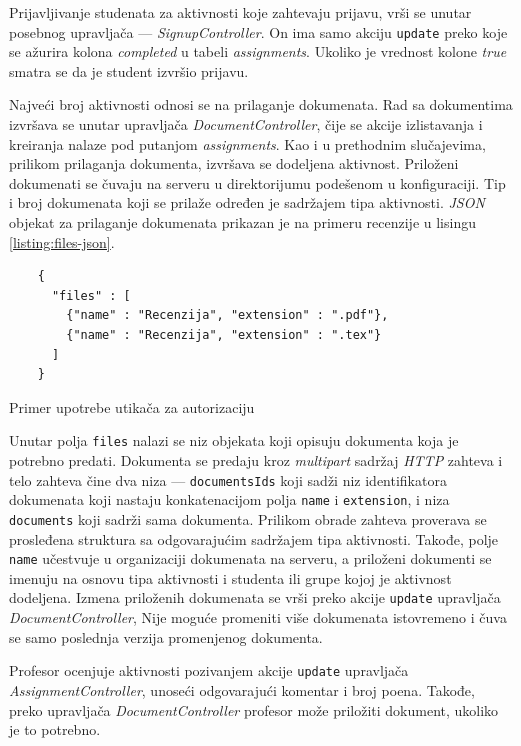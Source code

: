 \documentclass[12pt,oneside]{memoir}
\begin{document}
Prijavljivanje studenata za aktivnosti koje zahtevaju prijavu, vrši se unutar posebnog upravljača --- \emph{SignupController}.
On ima samo akciju \texttt{update} preko koje se ažurira kolona \emph{completed} u tabeli \emph{assignments}.
Ukoliko je vrednost kolone \emph{true} smatra se da je student izvršio prijavu.

Najveći broj aktivnosti odnosi se na prilaganje dokumenata. Rad sa dokumentima izvršava se unutar upravljača \emph{DocumentController},
čije se akcije izlistavanja i kreiranja nalaze pod putanjom \emph{assignments}. Kao i u prethodnim slučajevima, prilikom prilaganja dokumenta,
izvršava se dodeljena aktivnost. Priloženi dokumenati se čuvaju na serveru u direktorijumu podešenom u konfiguraciji.
Tip i broj dokumenata koji se prilaže određen je sadržajem tipa aktivnosti. \emph{JSON} objekat za prilaganje dokumenata prikazan je
na primeru recenzije u lisingu \ref{listing:files-json}. 
\begin{listing}[h!]
\begin{verbatim}
    {
      "files" : [
        {"name" : "Recenzija", "extension" : ".pdf"},
        {"name" : "Recenzija", "extension" : ".tex"}
      ]
    }
\end{verbatim}
\caption{Primer upotrebe utikača za autorizaciju}
\label{listing:files-json}
\end{listing}
Unutar polja \texttt{files} nalazi se niz objekata koji opisuju dokumenta koja je potrebno predati.
Dokumenta se predaju kroz \emph{multipart} sadržaj \emph{HTTP} zahteva i telo zahteva čine dva niza ---
\texttt{documentsIds} koji sadži niz identifikatora dokumenata koji nastaju konkatenacijom polja
\texttt{name} i \texttt{extension}, i niza \texttt{documents} koji sadrži sama dokumenta.
Prilikom obrade zahteva proverava se prosleđena struktura sa odgovarajućim sadržajem tipa aktivnosti.
Takođe, polje \texttt{name} učestvuje u organizaciji dokumenata na serveru, a priloženi dokumenti se
imenuju na osnovu tipa aktivnosti i studenta ili grupe kojoj je aktivnost dodeljena.
Izmena priloženih dokumenata se vrši preko akcije \texttt{update} upravljača \emph{DocumentController},
Nije moguće promeniti više dokumenata istovremeno i čuva se samo poslednja verzija promenjenog dokumenta.

Profesor ocenjuje aktivnosti pozivanjem akcije \texttt{update} upravljača \emph{AssignmentController},
unoseći odgovarajući komentar i broj poena. Takođe, preko upravljača \emph{DocumentController} profesor može
priložiti dokument, ukoliko je to potrebno.  
\end{document}

